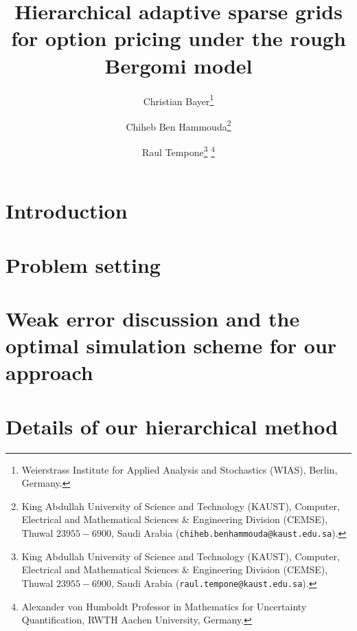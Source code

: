 \documentclass[11pt]{article}
\title{Hierarchical adaptive sparse  grids for option pricing under the rough Bergomi model}
\author{Christian Bayer\thanks{
 Weierstrass Institute for Applied Analysis and Stochastics (WIAS),
 Berlin, Germany.}
        \and Chiheb Ben Hammouda\thanks{King Abdullah University of Science and Technology (KAUST), Computer, Electrical and Mathematical Sciences \& Engineering Division (CEMSE), Thuwal $23955-6900$, Saudi Arabia ({\tt chiheb.benhammouda@kaust.edu.sa}).} 
\and  Raul Tempone\thanks{King Abdullah University of Science and Technology (KAUST), Computer, Electrical and Mathematical Sciences \& Engineering Division (CEMSE), Thuwal $23955-6900$, Saudi Arabia ({\tt raul.tempone@kaust.edu.sa}).} \thanks{Alexander von Humboldt Professor in Mathematics for Uncertainty Quantification, RWTH Aachen University, Germany.}}
\begin{document}
\maketitle

\begin{abstract}
	  
\end{abstract}






\thispagestyle{plain}

\setcounter{tocdepth}{1}


 \section{Introduction}




 \section{Problem setting}\label{sec:Problem setting}




 \section{Weak error discussion and the optimal simulation scheme for our approach}\label{sec:Weak error analysis}



 
\section{Details of our hierarchical method}\label{sec:Details our approach and error bounds}





%
%


%
\end{document}
